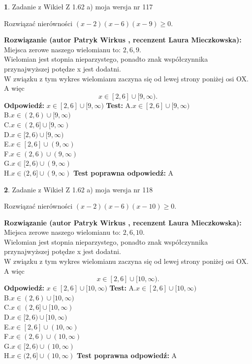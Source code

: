 \documentclass[12pt, a4paper]{article}
\theoremstyle{definition} %
\newtheorem{zad}{}
\newcommand{\zadStart}[1]{\begin{zad}#1\newline}
\newcommand{\zadStop}{\end{zad}}
\newcommand{\rozwStart}[2]{\noindent \textbf{Rozwiązanie (autor #1 , recenzent #2): }\newline}
\newcommand{\rozwStop}{\newline}
\newcommand{\odpStart}{\noindent \textbf{Odpowiedź:}\newline}
\newcommand{\odpStop}{\newline}
\newcommand{\testStart}{\noindent \textbf{Test:}\newline}
\newcommand{\testStop}{\newline}
\newcommand{\kluczStart}{\noindent \textbf{Test poprawna odpowiedź:}\newline}
\newcommand{\kluczStop}{\newline}
\begin{document}
\zadStart{Zadanie z Wikieł Z 1.62 a) moja wersja nr 117}

Rozwiązać nierówności $(x-2)(x-6)(x-9)\ge0$.
\zadStop
\rozwStart{Patryk Wirkus}{Laura Mieczkowska}
Miejsca zerowe naszego wielomianu to: $2, 6, 9$.\\
Wielomian jest stopnia nieparzystego, ponadto znak współczynnika przy\linebreak najwyższej potędze x jest dodatni.\\ W związku z tym wykres wielomianu zaczyna się od lewej strony poniżej osi OX. A więc $$x \in [2,6] \cup [9,\infty).$$
\rozwStop
\odpStart
$x \in [2,6] \cup [9,\infty)$
\odpStop
\testStart
A.$x \in [2,6] \cup [9,\infty)$\\
B.$x \in (2,6) \cup [9,\infty)$\\
C.$x \in (2,6] \cup [9,\infty)$\\
D.$x \in [2,6) \cup [9,\infty)$\\
E.$x \in [2,6] \cup (9,\infty)$\\
F.$x \in (2,6) \cup (9,\infty)$\\
G.$x \in [2,6) \cup (9,\infty)$\\
H.$x \in (2,6] \cup (9,\infty)$
\testStop
\kluczStart
A
\kluczStop



\zadStart{Zadanie z Wikieł Z 1.62 a) moja wersja nr 118}

Rozwiązać nierówności $(x-2)(x-6)(x-10)\ge0$.
\zadStop
\rozwStart{Patryk Wirkus}{Laura Mieczkowska}
Miejsca zerowe naszego wielomianu to: $2, 6, 10$.\\
Wielomian jest stopnia nieparzystego, ponadto znak współczynnika przy\linebreak najwyższej potędze x jest dodatni.\\ W związku z tym wykres wielomianu zaczyna się od lewej strony poniżej osi OX. A więc $$x \in [2,6] \cup [10,\infty).$$
\rozwStop
\odpStart
$x \in [2,6] \cup [10,\infty)$
\odpStop
\testStart
A.$x \in [2,6] \cup [10,\infty)$\\
B.$x \in (2,6) \cup [10,\infty)$\\
C.$x \in (2,6] \cup [10,\infty)$\\
D.$x \in [2,6) \cup [10,\infty)$\\
E.$x \in [2,6] \cup (10,\infty)$\\
F.$x \in (2,6) \cup (10,\infty)$\\
G.$x \in [2,6) \cup (10,\infty)$\\
H.$x \in (2,6] \cup (10,\infty)$
\testStop
\kluczStart
A
\kluczStop
\end{document}
